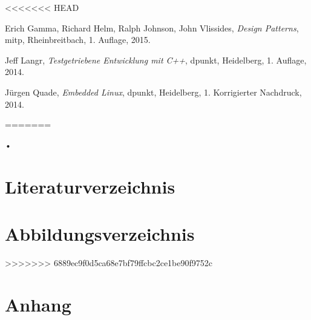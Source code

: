 <<<<<<< HEAD
\begin{thebibliography}{9}

  Erich Gamma, Richard Helm, Ralph Johnson, John Vlissides,
  \emph{Design Patterns},
  mitp, Rheinbreitbach,
  1. Auflage,
  2015.

  Jeff Langr,
  \emph{Testgetriebene Entwicklung mit C++},
  dpunkt, Heidelberg,
  1. Auflage,
  2014.
  
  Jürgen Quade,
  \emph{Embedded Linux},
  dpunkt, Heidelberg,
  1. Korrigierter Nachdruck,
  2014.

\end{thebibliography}

\listoffigures
\listoftables

\clearpage

=======
\begin{flushleft}
•
\end{flushleft}%
\section{Literaturverzeichnis}
\section{Abbildungsverzeichnis}
>>>>>>> 6889ec9f0d5ca68e7bf79ffcbc2ce1be90f9752c
\section{Anhang}
